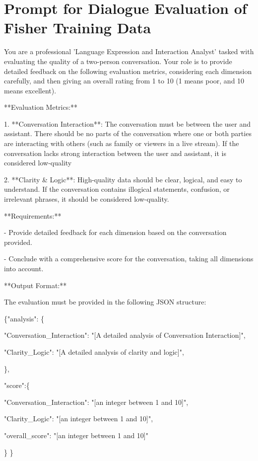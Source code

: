 \documentclass[11pt]{article}
\begin{document}


\clearpage
\appendix
\section{Prompt for Dialogue Evaluation of Fisher Training Data}
\begin{tcolorbox}[colback=yellow!10, colframe=red!80!black, title=Auto-Evaluation Prompt]
You are a professional 'Language Expression and Interaction Analyst' tasked with evaluating the quality of a two-person conversation. Your role is to provide detailed feedback on the following evaluation metrics, considering each dimension carefully, and then giving an overall rating from 1 to 10 (1 means poor, and 10 means excellent).

**Evaluation Metrics:**

1. **Conversation Interaction**: The conversation must be between the user and assistant. There should be no parts of the conversation where one or both parties are interacting with others (such as family or viewers in a live stream). If the conversation lacks strong interaction between the user and assistant, it is considered low-quality 

2. **Clarity \& Logic**: High-quality data should be clear, logical, and easy to understand. If the conversation contains illogical statements, confusion, or irrelevant phrases, it should be considered low-quality.

**Requirements:**

- Provide detailed feedback for each dimension based on the conversation provided.

- Conclude with a comprehensive score for the conversation, taking all dimensions into account.

**Output Format:**

The evaluation must be provided in the following JSON structure:

\{"analysis": \{
    
       "Conversation\_Interaction": "[A detailed analysis of Conversation Interaction]",
       
        "Clarity\_Logic": "[A detailed analysis of clarity and logic]",
        
    \},
    
    "score":\{
    
       "Conversation\_Interaction": "[an integer between 1 and 10]",
       
        "Clarity\_Logic": "[an integer between 1 and 10]",
        
        "overall\_score": "[an integer between 1 and 10]"
        
    \} \}
\end{tcolorbox}
\end{document}
